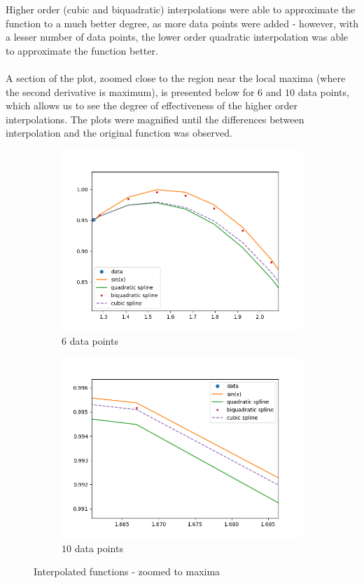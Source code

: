 \documentclass[12pt]{article}
\begin{document}
Higher order (cubic and biquadratic) interpolations were able to approximate the function to a much better degree, as more data points were added - however, with a lesser number of data points, the lower order quadratic interpolation was able to approximate the function better. \\\\ A section of the plot, zoomed close to the region near the local maxima (where the second derivative is maximum), is presented below for $6$ and $10$ data points, which allows us to see the degree of effectiveness of the higher order interpolations. The plots were magnified until the differences between interpolation and the original function was observed. 
\begin{figure}[h]
	\begin{subfigure}[h]{0.5\textwidth}
		\centering
		\includegraphics[width=\textwidth]{1cn6zoom.png}
		\caption{$6$ data points}
	\end{subfigure}
	\hfill
	\begin{subfigure}[h]{0.5\textwidth}
		\centering
		\includegraphics[width=\textwidth]{1cn10zoom.png}
		\caption{$10$ data points}
	\end{subfigure}
	\caption{Interpolated functions - zoomed to maxima}
\end{figure}
\end{document}

